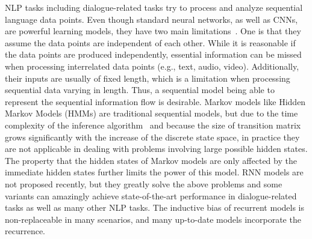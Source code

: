 \label{RNNs and Vanilla Sequence-to-sequence Models}
NLP tasks including dialogue-related tasks try to process and analyze sequential language data points. Even though standard neural networks, as well as CNNs, are powerful learning models, they have two main limitations~. One is that they assume the data points are independent of each other. While it is reasonable if the data points are produced independently, essential information can be missed when processing interrelated data points (e.g., text, audio, video). Additionally, their inputs are usually of fixed length, which is a limitation when processing sequential data varying in length. Thus, a sequential model being able to represent the sequential information flow is desirable. 
Markov models like Hidden Markov Models (HMMs) are traditional sequential models, but due to the time complexity of the inference algorithm~ and because the size of transition matrix grows significantly with the increase of the discrete state space, in practice they are not applicable in dealing with problems involving large possible hidden states. The property that the hidden states of Markov models are only affected by the immediate hidden states further limits the power of this model.
RNN models are not proposed recently, but they greatly solve the above problems and some variants can amazingly achieve state-of-the-art performance in dialogue-related tasks as well as many other NLP tasks. The inductive bias of recurrent models is non-replaceable in many scenarios, and many up-to-date models incorporate the recurrence.

